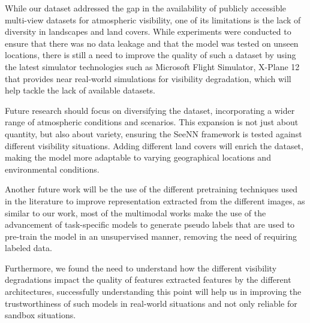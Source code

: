 While our dataset addressed the gap in the availability of publicly accessible multi-view datasets for atmospheric visibility, one of its limitations is the lack of diversity in landscapes and land covers. While experiments were conducted to ensure that there was no data leakage and that the model was tested on unseen locations, there is still a need to improve the quality of such a dataset by using the latest simulator technologies such as Microsoft Flight Simulator, X-Plane 12 that provides near real-world simulations for visibility degradation, which will help tackle the lack of available datasets.

Future research should focus on diversifying the dataset, incorporating a wider range of atmospheric conditions and scenarios. This expansion is not just about quantity, but also about variety, ensuring the SeeNN framework is tested against different visibility situations. Adding different land covers will enrich the dataset, making the model more adaptable to varying geographical locations and environmental conditions.

Another future work will be the use of the different pretraining techniques used in the literature to improve representation extracted from the different images, as similar to our work, most of the multimodal works make the use of the advancement of task-specific models to generate pseudo labels that are used to pre-train the model in an unsupervised manner, removing the need of requiring labeled data.

Furthermore, we found the need to understand how the different visibility degradations impact the quality of features extracted features by the different architectures, successfully understanding this point will help us in improving the trustworthiness of such models in real-world situations and not only reliable for sandbox situations.



